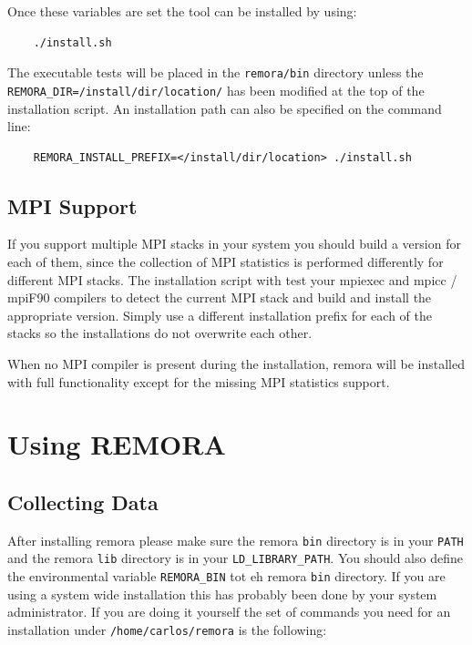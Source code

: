 \documentclass[10pt,a4paper]{report}
\begin{document}
Once these variables are set the tool can be installed by using:

\begin{verbatim}
    ./install.sh
\end{verbatim}

The executable tests will be placed in the \verb+remora/bin+ directory unless the \verb+REMORA_DIR=/install/dir/location/+ has been modified at the top of the installation script. An installation path can also be specified on the command line:

\begin{verbatim}
    REMORA_INSTALL_PREFIX=</install/dir/location> ./install.sh
\end{verbatim}

\section{MPI Support}
If you support multiple MPI stacks in your system you should build a version for each of them, since the collection of MPI statistics is performed differently for different MPI stacks. The installation script with test your mpiexec and mpicc / mpiF90 compilers to detect the current MPI stack and build and install the appropriate version. Simply use a different installation prefix for each of the stacks so the installations do not overwrite each other. 

When no MPI compiler is present during the installation, remora will be installed with full functionality except for the missing MPI statistics support.

\FloatBarrier
\chapter{Using REMORA}

\section{Collecting Data}
After installing remora please make sure the remora \verb+bin+ directory is in your \verb+PATH+ and the remora \verb+lib+ directory is in your \verb|LD_LIBRARY_PATH|. You should also define the environmental variable \verb+REMORA_BIN+ tot eh remora \verb+bin+ directory. If you are using a system wide installation this has probably been done by your system administrator. If you are doing it yourself the set of commands you need for an installation under \verb+/home/carlos/remora+ is the following:
\end{document}

